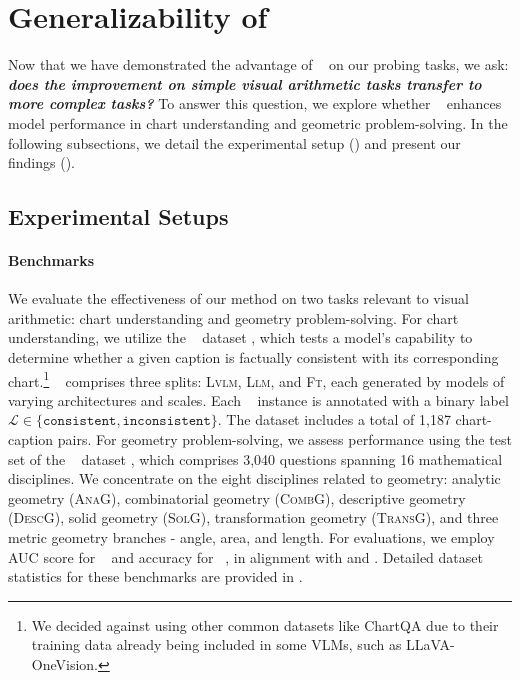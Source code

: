 \section{Generalizability of \method~}

\label{sec:exps}
Now that we have demonstrated the advantage of \method~ on our probing tasks, we ask: \textbf{\textit{does the improvement on simple visual arithmetic tasks transfer to more complex tasks?}} To answer this question, we explore whether \method~ enhances model performance in chart understanding and geometric problem-solving. In the following subsections, we detail the experimental setup () and present our findings ().

\subsection{Experimental Setups}
\label{subsec:exp_setup}

\paragraph{Benchmarks}
We evaluate the effectiveness of our method on two tasks relevant to visual arithmetic: chart understanding and geometry problem-solving. For chart understanding, we utilize the \chocolate~ dataset \cite{huang-etal-2024-lvlms}, which tests a model's capability to determine whether a given caption is factually consistent with its corresponding chart.\footnote{We decided against using other common datasets like ChartQA \cite{masry-etal-2022-chartqa} due to their training data already being included in some VLMs, such as LLaVA-OneVision.} \chocolate~ comprises three splits: \textsc{Lvlm}, \textsc{Llm}, and \textsc{Ft}, each generated by models of varying architectures and scales. Each \chocolate~ instance is annotated with a binary label $\mathcal{L} \in \{\texttt{consistent}, \texttt{inconsistent}\}$. The dataset includes a total of 1,187 chart-caption pairs. For geometry problem-solving, we assess performance using the test set of the \mathv~ dataset \cite{wang2024mathv}, which comprises 3,040 questions spanning 16 mathematical disciplines. We concentrate on the eight disciplines related to geometry: analytic geometry (\textsc{AnaG}), combinatorial geometry (\textsc{CombG}), descriptive geometry (\textsc{DescG}), solid geometry (\textsc{SolG}), transformation geometry (\textsc{TransG}), and three metric geometry branches - angle, area, and length. For evaluations, we employ AUC score for \chocolate~ and accuracy for \mathv~, in alignment with \citet{huang-etal-2024-lvlms} and \citet{wang2024mathv}. Detailed dataset statistics for these benchmarks are provided in .



